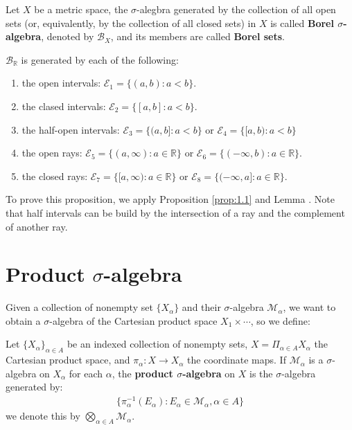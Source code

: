 \begin{definition}
 \normalfont Let $X$ be a metric space, the $\sigma$-alegbra generated by the collection of all open sets (or, equivalently, by the collection of all closed sets) in $X$ is called \textbf{Borel $\sigma$-algebra}, denoted by $\mathcal{B}_X$, and its members are called \textbf{Borel sets}. 
\end{definition}

\begin{proposition}
 \normalfont $\mathcal{B}_\mathbb{R}$ is generated by each of the following:
 \begin{enumerate}
    \item the open intervals: $\mathcal{E}_1 = \{ (a,b) : a < b \}$.
    \item the clased intervals: $\mathcal{E}_2 = \{ [a,b] : a < b \}$.
    \item the half-open intervals: $\mathcal{E}_3 = \{ (a,b] : a < b \}$ or $\mathcal{E}_4 = \{ [a,b) : a < b \}$
    \item the open rays: $\mathcal{E}_5 = \{ (a,\infty) : a \in \mathbb{R} \}$ or $\mathcal{E}_6 = \{ (-\infty,b) : a \in \mathbb{R} \}$.
    \item the closed rays: $\mathcal{E}_7 = \{ [a,\infty) : a \in \mathbb{R} \}$ or $\mathcal{E}_8 = \{ (-\infty, a] : a \in \mathbb{R} \}$.
 \end{enumerate}
\end{proposition}

\begin{proofidea}
    To prove this proposition, we apply Proposition \ref{prop:1.1} and Lemma . Note that half intervals can be build by the intersection of a ray and the complement of another ray.
\end{proofidea}

\section{Product $\sigma$-algebra} \label{sec:}
Given a collection of nonempty set $\{ X_\alpha\}$ and their $\sigma$-algebra $\mathcal{M}_\alpha$, we want to obtain a $\sigma$-algebra of the Cartesian product space $X_1 \times \cdots $, so we define:
\begin{definition}
 \normalfont Let $\{ X_\alpha \}_{\alpha \in A}$ be an indexed collection of nonempty sets, $X = \Pi_{\alpha \in A} X_\alpha$ the Cartesian product space, and $\pi_\alpha : X \to X_\alpha$ the coordinate maps. If $\mathcal{M}_\alpha$ is a $\sigma$-algebra on $X_\alpha$ for each $\alpha$, the \textbf{product $\sigma$-algebra} on $X$ is the $\sigma$-algebra generated by:
 \begin{align*}
    \{ \pi_\alpha^{-1}(E_\alpha) : E_\alpha \in \mathcal{M}_\alpha, \alpha \in A \}
 \end{align*}
 we denote this \sal by $\bigotimes_{\alpha \in A} \mathcal{M}_\alpha$.
\end{definition}

